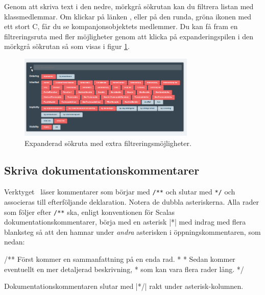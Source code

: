 Genom att skriva text i den nedre, mörkgrå sökrutan kan du filtrera listan med klassmedlemmar. Om klickar på länken , eller på den runda, gröna ikonen med ett stort C, får du se kompanjonsobjektets medlemmer.
Du kan få fram en filtreringsruta med fler möjligheter genom att klicka på expanderingspilen i den mörkgrå sökrutan så som visas i figur \ref{fig:scaladoc:filter}.



\begin{figure}[H]
\centering
\includegraphics[width=0.75\textwidth]{../img/scaladoc/scaladoc-filter}

     \caption{Expanderad sökruta med extra filtreringsmöjligheter.}
    \label{fig:scaladoc:filter}
\end{figure}


\clearpage

\subsection{Skriva dokumentationskommentarer}


Verktyget \scaladoc\ läser kommentarer som börjar med \verb|/**| och slutar med \verb|*/| och associeras till efterföljande deklaration. Notera de dubbla asteriskerna. Alla rader som följer efter \verb|/**| ska, enligt konventionen för Scalas dokumentationskommentarer, börja med en asterisk \code|*| med indrag med flera blanksteg så att den hamnar under \textit{andra} asterisken i öppningskommentaren, som nedan:
\begin{Code}
/** Först kommer en sammanfattning på en enda rad.
  *
  * Sedan kommer eventuellt en mer detaljerad beskrivning,
  * som kan vara flera rader lång.
  */
\end{Code}
Dokumentationskommentaren slutar med \code|*/| rakt under asterisk-kolumnen.

